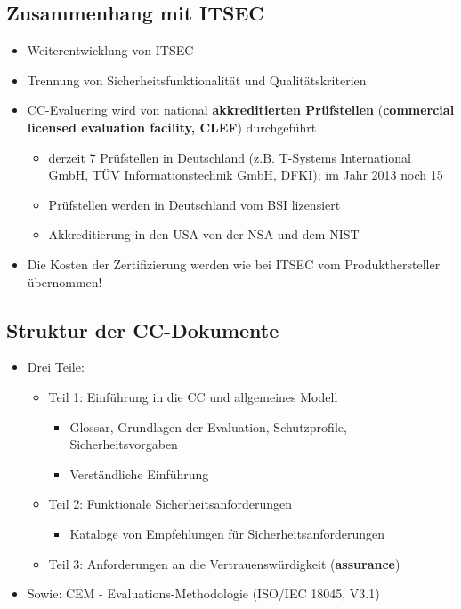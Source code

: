\documentclass[openany]{book}
\begin{document}
\subsection{Zusammenhang mit ITSEC}

\begin{itemize}
    \item Weiterentwicklung von ITSEC
    \item Trennung von Sicherheitsfunktionalität und Qualitätskriterien
    \item CC-Evaluering wird von national \textbf{akkreditierten Prüfstellen} (\textbf{commercial licensed evaluation facility, CLEF}) durchgeführt
    \begin{itemize}
        \item derzeit 7 Prüfstellen in Deutschland (z.B. T-Systems International GmbH, TÜV Informationstechnik GmbH, DFKI); im Jahr 2013 noch 15
        \item Prüfstellen werden in Deutschland vom BSI lizensiert
        \item Akkreditierung in den USA von der NSA und dem NIST
    \end{itemize}
    \item Die Kosten der Zertifizierung werden wie bei ITSEC vom Produkthersteller übernommen!
\end{itemize}

\subsection{Struktur der CC-Dokumente}

\begin{itemize}
    \item Drei Teile:
    \begin{itemize}
        \item Teil 1: Einführung in die CC und allgemeines Modell
        \begin{itemize}
            \item Glossar, Grundlagen der Evaluation, Schutzprofile, Sicherheitsvorgaben
            \item Verständliche Einführung
        \end{itemize}
        \item Teil 2: Funktionale Sicherheitsanforderungen
        \begin{itemize}
            \item Kataloge von Empfehlungen für Sicherheitsanforderungen
        \end{itemize}
        \item Teil 3: Anforderungen an die Vertrauenswürdigkeit (\textbf{assurance})
    \end{itemize}
    \item Sowie: CEM - Evaluations-Methodologie (ISO/IEC 18045, V3.1)
\end{itemize}
\end{document}

